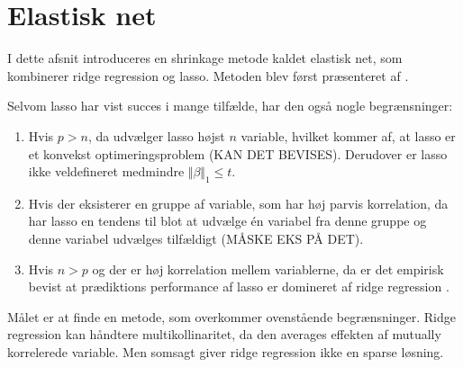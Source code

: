 \section{Elastisk net}
I dette afsnit introduceres en shrinkage metode kaldet elastisk net, som kombinerer ridge regression og lasso.
Metoden blev først præsenteret af \citep{zou_hastie}.

Selvom lasso har vist succes i mange tilfælde, har den også nogle begrænsninger:
%
\begin{enumerate}[label=\textnormal{(\arabic*)}]
    \item Hvis $p>n$, da udvælger lasso højst $n$ variable, hvilket kommer af, at lasso er et konvekst optimeringsproblem (KAN DET BEVISES). Derudover er lasso ikke veldefineret medmindre \(\Vert \beta \Vert_1 \leq t\). \label{itm:1}
    \item Hvis der eksisterer en gruppe af variable, som har høj parvis korrelation, da har lasso en tendens til blot at udvælge  én variabel fra denne gruppe og denne variabel udvælges tilfældigt (MÅSKE EKS PÅ DET). \label{itm:2}
    \item Hvis $n>p$ og der er høj korrelation mellem variablerne, da er det empirisk bevist at prædiktions performance af lasso er domineret af ridge regression \citep{lasso}.  \label{itm:3}
\end{enumerate}
%
Målet er at finde en metode, som overkommer ovenstående begrænsninger.
Ridge regression kan håndtere multikollinaritet, da den averages effekten af mutually korrelerede variable.
Men somsagt giver ridge regression ikke en sparse løsning.

